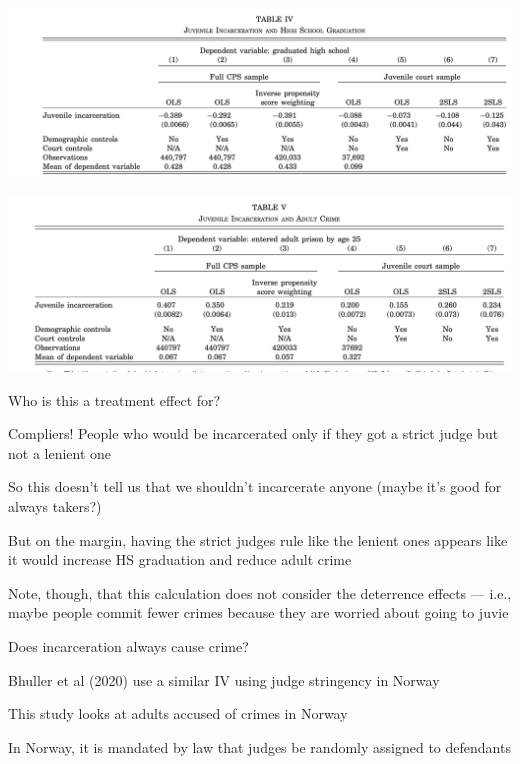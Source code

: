 \documentclass[11pt,english,handout]{beamer}
\newenvironment{wideitemize}{\itemize\addtolength{\itemsep}{10pt}}{\enditemize}
\begin{document}
\begin{frame}
	\begin{center}
		\includegraphics[width = 0.95\linewidth]{iv-graduation}
	\end{center}
\end{frame}

\begin{frame}
	\includegraphics[width = 0.95 \linewidth]{iv-crime}
\end{frame}

\begin{frame}{Who is this a treatment effect for? }

\pause
\begin{wideitemize}
	\item
	Compliers! People who would be incarcerated only if they got a strict judge but not a lenient one
	\pause
	\item
	So this doesn't tell us that we shouldn't incarcerate anyone (maybe it's good for always takers?)
	
	\item
	But on the margin, having the strict judges rule like the lenient ones appears like it would increase HS graduation and reduce adult crime
	
	\pause
	\item
	Note, though, that this calculation does not consider the deterrence effects --- i.e., maybe people commit fewer crimes because they are worried about going to juvie
\end{wideitemize}
\end{frame}

\begin{frame}{Does incarceration always cause crime?}
\pause
\begin{wideitemize}
	\item
	Bhuller et al (2020) use a similar IV using judge stringency in Norway
	
	\item
	This study looks at adults accused of crimes in Norway
	
	\item
	In Norway, it is mandated by law that judges be randomly assigned to defendants
\end{wideitemize}

\end{frame}
\end{document}
